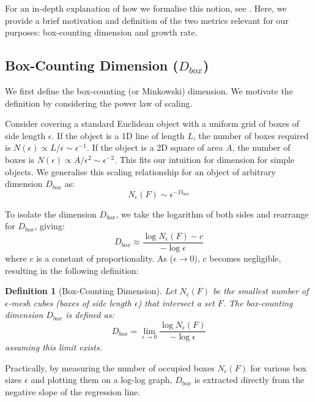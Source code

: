 \documentclass[12pt, a4paper, oneside]{report}
\newtheorem{definition}[theorem]{Definition}
\theoremstyle{remark}
\begin{document}
For an in-depth explanation of how we formalise this notion, see \cite{Falconer1990}. Here, we provide a brief motivation and definition of the two metrics relevant for our purposes: box-counting dimension and growth rate.
\subsection{Box-Counting Dimension (\texorpdfstring{$D_{box}$}{D\_box})}
We first define the box-counting (or Minkowski) dimension. We motivate the definition by considering the power law of scaling. 

Consider covering a standard Euclidean object with a uniform grid of boxes of side length $\epsilon$. If the object is a 1D line of length $L$, the number of boxes required is $N(\epsilon) \propto L/\epsilon \sim \epsilon^{-1}$. If the object is a 2D square of area $A$, the number of boxes is $N(\epsilon) \propto A/\epsilon^2 \sim \epsilon^{-2}$. This fits our intuition for dimension for simple objects. We generalise this scaling relationship for an object of arbitrary dimension $D_{box}$ as:
\begin{equation*}
    N_{\epsilon}(F) \sim \epsilon^{-D_{box}}
\end{equation*}

To isolate the dimension $D_{box}$, we take the logarithm of both sides and rearrange for $D_{box}$, giving:
\begin{equation*}
    D_{box} \approx \frac{\log N_{\epsilon}(F) - c}{-\log \epsilon}
\end{equation*}
where $c$ is a constant of proportionality. As ($\epsilon \to 0$), $c$ becomes negligible, resulting in the following definition:

\begin{definition}[Box-Counting Dimension]
Let $N_{\epsilon}(F)$ be the smallest number of $\epsilon$-mesh cubes (boxes of side length $\epsilon$) that intersect a set $F$. The box-counting dimension $D_{box}$ is defined as:
\begin{equation*}
    D_{box} = \lim_{\epsilon \to 0} \frac{\log N_{\epsilon}(F)}{-\log \epsilon}
\end{equation*}
assuming this limit exists.
\end{definition}

Practically, by measuring the number of occupied boxes $N_{\epsilon}(F)$ for various box sizes $\epsilon$ and plotting them on a log-log graph, $D_{box}$ is extracted directly from the negative slope of the regression line.
\end{document}
